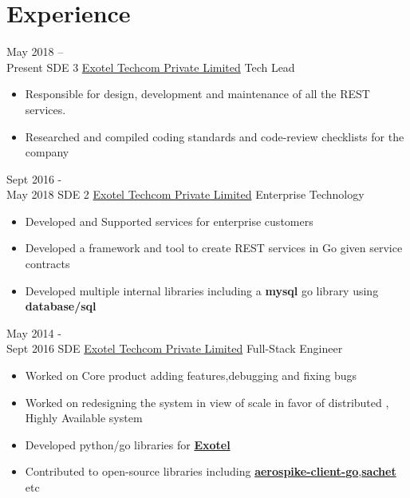 \documentclass[letterpaper]{twentysecondcv} %
\begin{document}
\makeprofile %

\section{Experience}

\begin{twenty} %
	\twentyitem
    	{May 2018 -- \\Present}
        {SDE 3}
        {\href{http://exotel.com/}{Exotel Techcom Private Limited}}
        {Tech Lead}
        {
        {\begin{itemize}
        \item Responsible for design, development and maintenance of all the REST services.
        \item Researched and compiled coding standards and code-review checklists for the company  
    	\end{itemize}}
        }
        
    \twentyitem
   		{Sept 2016 - \\ May 2018}
        {SDE 2}
        {\href{http://exotel.com/}{Exotel Techcom Private Limited}}
        {Enterprise Technology}
        {
        {\begin{itemize}
        \item Developed and Supported services for enterprise customers  
        \item Developed a framework and tool to create REST services in Go given service contracts 
        \item Developed multiple internal libraries including a \textbf{mysql} go library using \textbf{database/sql}
    	\end{itemize}}
        }
        
     \twentyitem
   		{May 2014 - \\ Sept  2016}
        {SDE}
        {\href{http://exotel.com/}{Exotel Techcom Private Limited}}
        {Full-Stack Engineer}
        {
        \begin{itemize}
        	\item Worked on Core product adding features,debugging and fixing bugs
            \item Worked on redesigning the system in view of scale in favor of distributed , Highly Available system
            \item Developed python/go libraries for {\href{https://github.com/sarathsp06/exotel-py}\textbf{Exotel}}
            \item Contributed to open-source libraries including {\href{https://github.com/aerospike/aerospike-client-go}{\textbf{aerospike-client-go}}},{\href{https://github.com/messagebird/sachet}{\textbf{sachet}}} etc  
    	\end{itemize}
    	}
        

\end{twenty}
\end{document}
